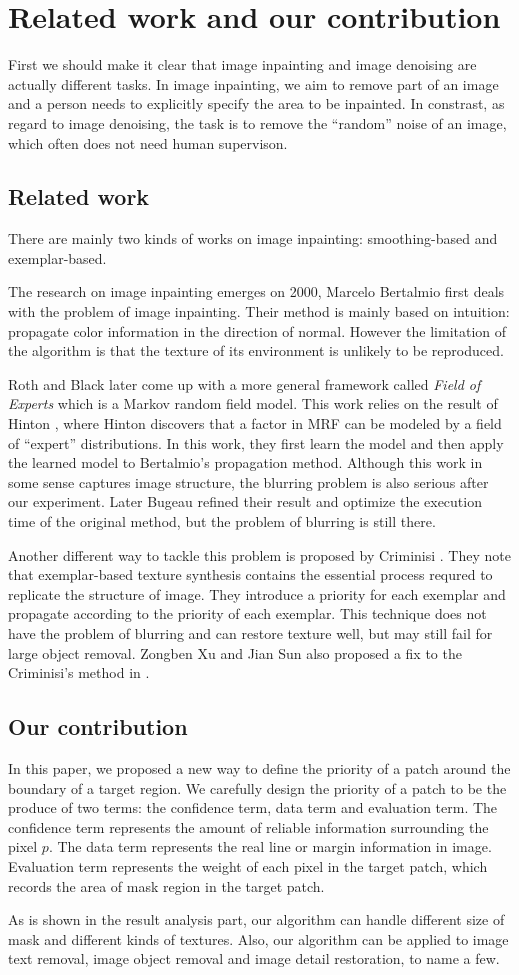 \section{Related work and our contribution}
First we should make it clear that image inpainting and image denoising are
actually different tasks. In image inpainting, we aim to remove part of 
an image and a person needs to explicitly specify the area to be inpainted.
In constrast, as regard to image denoising, the task is to remove the 
``random'' noise of an image, which often does not need human supervison.
\subsection{Related work}
There are mainly two kinds of works on image inpainting: smoothing-based and
exemplar-based.

The research on image inpainting emerges on 2000, Marcelo Bertalmio \etal
\cite{siggraph00} first deals with the problem of image inpainting. Their
method is mainly based on intuition: propagate color information in the
direction of normal. However the limitation of the algorithm is that the
texture of its environment is unlikely to be reproduced.

Roth and Black \cite{cvpr05} later come up with a more general framework 
called \emph{Field of Experts} which is a Markov random field model. This
work relies on the result of Hinton \cite{neco02, nips02}, where Hinton discovers
that a factor in MRF can be modeled by a field of ``expert'' distributions.
In this work, they first learn the model and then apply the learned model
to Bertalmio's propagation method. Although this work in some sense captures
image structure, the blurring problem is also serious after our experiment. Later Bugeau\etal \cite{tip10} refined their result and optimize the execution time of the original method, but the problem of blurring is still there.

Another different way to tackle this problem is proposed by Criminisi \etal
 \cite{cvpr03,tip04}. They note that exemplar-based texture synthesis
 contains the essential process requred to replicate the structure of image.
 They introduce a priority for each exemplar and propagate according to
 the priority of each exemplar. This technique does not have the problem
 of blurring and can restore texture well, but may still fail for large
 object removal. Zongben Xu and Jian Sun also proposed a fix to the Criminisi's method in \cite{tip10sj}.

\subsection{Our contribution}
In this paper, we proposed a new way to define the priority of a patch 
around the boundary of a target region. We carefully design the priority of a patch to be the produce of two terms: the confidence term, data term and evaluation term.
The confidence term represents the amount of reliable information surrounding the pixel $p$. The data term represents the real line or margin information in image. Evaluation term represents the weight of each pixel in the target patch, which records the area of mask region in the target patch.

As is shown in the result analysis part, our algorithm can handle different size of mask and different kinds of textures. Also, our algorithm can be applied to image text removal, image object removal and image detail restoration, to name a few.
